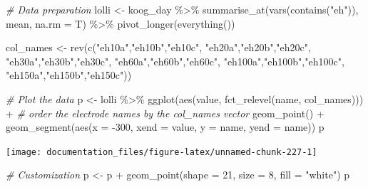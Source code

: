 \documentclass[
]{article}
\newenvironment{Shaded}{\begin{snugshade}}{\end{snugshade}}
\newcommand{\AttributeTok}[1]{\textcolor[rgb]{0.77,0.63,0.00}{#1}}
\newcommand{\CommentTok}[1]{\textcolor[rgb]{0.56,0.35,0.01}{\textit{#1}}}
\newcommand{\DecValTok}[1]{\textcolor[rgb]{0.00,0.00,0.81}{#1}}
\newcommand{\FunctionTok}[1]{\textcolor[rgb]{0.00,0.00,0.00}{#1}}
\newcommand{\NormalTok}[1]{#1}
\newcommand{\OtherTok}[1]{\textcolor[rgb]{0.56,0.35,0.01}{#1}}
\newcommand{\SpecialCharTok}[1]{\textcolor[rgb]{0.00,0.00,0.00}{#1}}
\newcommand{\StringTok}[1]{\textcolor[rgb]{0.31,0.60,0.02}{#1}}
\begin{document}
\begin{Shaded}
\begin{Highlighting}[]
\CommentTok{\# Data preparation}
\NormalTok{lolli }\OtherTok{\textless{}{-}}\NormalTok{ koog\_day }\SpecialCharTok{\%\textgreater{}\%}
  \FunctionTok{summarise\_at}\NormalTok{(}\FunctionTok{vars}\NormalTok{(}\FunctionTok{contains}\NormalTok{(}\StringTok{"eh"}\NormalTok{)), mean, }\AttributeTok{na.rm =}\NormalTok{ T) }\SpecialCharTok{\%\textgreater{}\%}
  \FunctionTok{pivot\_longer}\NormalTok{(}\FunctionTok{everything}\NormalTok{())}

\NormalTok{col\_names }\OtherTok{\textless{}{-}} \FunctionTok{rev}\NormalTok{(}\FunctionTok{c}\NormalTok{(}\StringTok{"eh10a"}\NormalTok{,}\StringTok{"eh10b"}\NormalTok{,}\StringTok{"eh10c"}\NormalTok{,}
                   \StringTok{"eh20a"}\NormalTok{,}\StringTok{"eh20b"}\NormalTok{,}\StringTok{"eh20c"}\NormalTok{,}
                   \StringTok{"eh30a"}\NormalTok{,}\StringTok{"eh30b"}\NormalTok{,}\StringTok{"eh30c"}\NormalTok{,}
                                           \StringTok{"eh60a"}\NormalTok{,}\StringTok{"eh60b"}\NormalTok{,}\StringTok{"eh60c"}\NormalTok{,}
                                           \StringTok{"eh100a"}\NormalTok{,}\StringTok{"eh100b"}\NormalTok{,}\StringTok{"eh100c"}\NormalTok{,}
                                           \StringTok{"eh150a"}\NormalTok{,}\StringTok{"eh150b"}\NormalTok{,}\StringTok{"eh150c"}\NormalTok{))}
  


\CommentTok{\# Plot the data}
\NormalTok{p }\OtherTok{\textless{}{-}}\NormalTok{ lolli }\SpecialCharTok{\%\textgreater{}\%}
  \FunctionTok{ggplot}\NormalTok{(}\FunctionTok{aes}\NormalTok{(value, }\FunctionTok{fct\_relevel}\NormalTok{(name, col\_names))) }\SpecialCharTok{+} \CommentTok{\# order the electrode names by the col\_names vector}
  \FunctionTok{geom\_point}\NormalTok{() }\SpecialCharTok{+}
  \FunctionTok{geom\_segment}\NormalTok{(}\FunctionTok{aes}\NormalTok{(}\AttributeTok{x =} \SpecialCharTok{{-}}\DecValTok{300}\NormalTok{, }\AttributeTok{xend =}\NormalTok{ value, }\AttributeTok{y =}\NormalTok{ name, }\AttributeTok{yend =}\NormalTok{ name))}
\NormalTok{p}
\end{Highlighting}
\end{Shaded}

\begin{center}\texttt{[image: documentation\_files/figure-latex/unnamed-chunk-227-1]} \end{center}

\begin{Shaded}
\begin{Highlighting}[]
\CommentTok{\# Customization }
\NormalTok{p }\OtherTok{\textless{}{-}}\NormalTok{ p }\SpecialCharTok{+} \FunctionTok{geom\_point}\NormalTok{(}\AttributeTok{shape =} \DecValTok{21}\NormalTok{, }\AttributeTok{size =} \DecValTok{8}\NormalTok{, }\AttributeTok{fill =} \StringTok{"white"}\NormalTok{)}
\NormalTok{p}
\end{Highlighting}
\end{Shaded}
\end{document}
